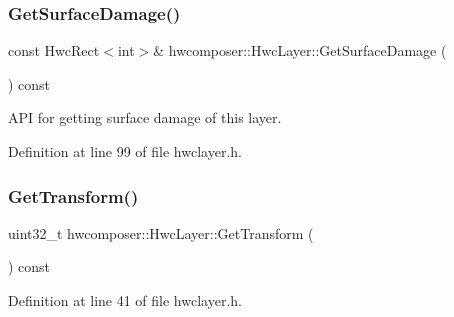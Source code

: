 \subsubsection{\texorpdfstring{Get\+Surface\+Damage()}{GetSurfaceDamage()}}
{\footnotesize\ttfamily const Hwc\+Rect$<$int$>$\& hwcomposer\+::\+Hwc\+Layer\+::\+Get\+Surface\+Damage (\begin{DoxyParamCaption}{ }\end{DoxyParamCaption}) const\hspace{0.3cm}{\ttfamily [inline]}}

A\+PI for getting surface damage of this layer. 

Definition at line 99 of file hwclayer.\+h.


\begin{DoxyCode}{0}
\end{DoxyCode}
\mbox{\label{structhwcomposer_1_1HwcLayer_a93f6c42bb261d8ce5899d7058948b1f7}} 
\subsubsection{\texorpdfstring{Get\+Transform()}{GetTransform()}}
{\footnotesize\ttfamily uint32\+\_\+t hwcomposer\+::\+Hwc\+Layer\+::\+Get\+Transform (\begin{DoxyParamCaption}{ }\end{DoxyParamCaption}) const\hspace{0.3cm}{\ttfamily [inline]}}



Definition at line 41 of file hwclayer.\+h.


\begin{DoxyCode}{0}
\end{DoxyCode}
\mbox{\label{structhwcomposer_1_1HwcLayer_a610c7437c3e292b6b8cc7384891fbfc2}} 
